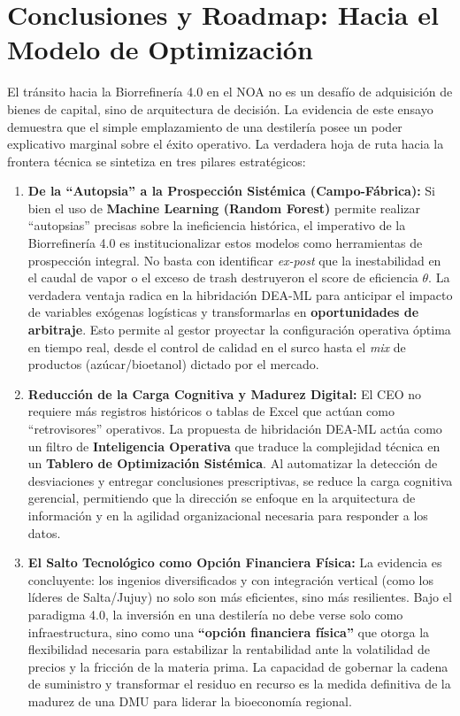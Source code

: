 \documentclass[
  spanish]{cyta}
\begin{document}
\section{Conclusiones y Roadmap: Hacia el Modelo de
Optimización}\label{conclusiones-y-roadmap-hacia-el-modelo-de-optimizaciuxf3n}

El tránsito hacia la Biorrefinería 4.0 en el NOA no es un desafío de
adquisición de bienes de capital, sino de arquitectura de decisión. La
evidencia de este ensayo demuestra que el simple emplazamiento de una
destilería posee un poder explicativo marginal sobre el éxito operativo.
La verdadera hoja de ruta hacia la frontera técnica se sintetiza en tres
pilares estratégicos:

\begin{enumerate}
\def\labelenumi{\arabic{enumi}.}
\item
  \textbf{De la ``Autopsia'' a la Prospección Sistémica
  (Campo-Fábrica):} Si bien el uso de \textbf{Machine Learning (Random
  Forest)} permite realizar ``autopsias'' precisas sobre la ineficiencia
  histórica, el imperativo de la Biorrefinería 4.0 es institucionalizar
  estos modelos como herramientas de prospección integral. No basta con
  identificar \emph{ex-post} que la inestabilidad en el caudal de vapor
  o el exceso de trash destruyeron el score de eficiencia \(\theta\). La
  verdadera ventaja radica en la hibridación DEA-ML para anticipar el
  impacto de variables exógenas logísticas y transformarlas en
  \textbf{oportunidades de arbitraje}. Esto permite al gestor proyectar
  la configuración operativa óptima en tiempo real, desde el control de
  calidad en el surco hasta el \emph{mix} de productos
  (azúcar/bioetanol) dictado por el mercado.
\item
  \textbf{Reducción de la Carga Cognitiva y Madurez Digital:} El CEO no
  requiere más registros históricos o tablas de Excel que actúan como
  ``retrovisores'' operativos. La propuesta de hibridación DEA-ML actúa
  como un filtro de \textbf{Inteligencia Operativa} que traduce la
  complejidad técnica en un \textbf{Tablero de Optimización Sistémica}.
  Al automatizar la detección de desviaciones y entregar conclusiones
  prescriptivas, se reduce la carga cognitiva gerencial, permitiendo que
  la dirección se enfoque en la arquitectura de información y en la
  agilidad organizacional necesaria para responder a los datos.
\item
  \textbf{El Salto Tecnológico como Opción Financiera Física:} La
  evidencia es concluyente: los ingenios diversificados y con
  integración vertical (como los líderes de Salta/Jujuy) no solo son más
  eficientes, sino más resilientes. Bajo el paradigma 4.0, la inversión
  en una destilería no debe verse solo como infraestructura, sino como
  una \textbf{``opción financiera física''} que otorga la flexibilidad
  necesaria para estabilizar la rentabilidad ante la volatilidad de
  precios y la fricción de la materia prima. La capacidad de gobernar la
  cadena de suministro y transformar el residuo en recurso es la medida
  definitiva de la madurez de una DMU para liderar la bioeconomía
  regional.
\end{enumerate}
\end{document}
